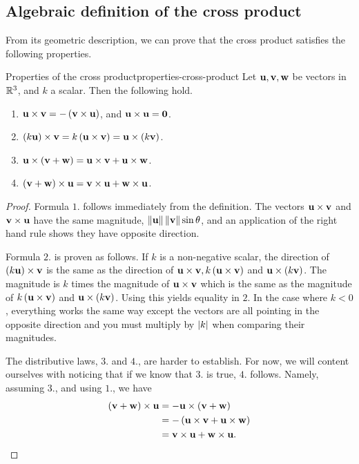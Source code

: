 \subsection{Algebraic definition of the cross product}

From its geometric description, we can prove that the cross product
satisfies the following properties.

\begin{proposition}{Properties of the cross product}{properties-cross-product}
  Let $\mbox{\bf u}, \mbox{\bf v}, \mbox{\bf w}$ be vectors in $\mathbb{R}^3$, and $k$ a
  scalar. Then the following hold.%
  \begin{enumerate}
  \item
    $\mbox{\bf u}\times \mbox{\bf v}= -\left(\mbox{\bf v}\times \mbox{\bf u}\right)$,
    and $\mbox{\bf u}\times \mbox{\bf u}=\mbox{\bf 0}$.
  \item $\left(k \mbox{\bf u}\right)\times \mbox{\bf v}= k \left(\mbox{\bf u}\times \mbox{\bf v}\right) 
    =\mbox{\bf u}\times \left(k \mbox{\bf v}\right)$.
  \item $\mbox{\bf u}\times \left(\mbox{\bf v}+\mbox{\bf w}\right) =\mbox{\bf u}\times \mbox{\bf v}+\mbox{\bf u}\times \mbox{\bf w}$.
  \item $\left(\mbox{\bf v}+\mbox{\bf w}\right) \times \mbox{\bf u}=\mbox{\bf v} \times \mbox{\bf u}+\mbox{\bf w}\times \mbox{\bf u}$.
  \end{enumerate}
\end{proposition}

\begin{proof}
  Formula $1$. follows immediately from the definition. The vectors
  $\mbox{\bf u}\times \mbox{\bf v}$ and $\mbox{\bf v}\times \mbox{\bf u}$ have the
  same magnitude, $\left\|\mbox{\bf u}\right\|\left\|\mbox{\bf v}\right\|\sin \theta $, and an
  application of the right hand rule shows they have opposite
  direction.

  Formula $2$. is proven as follows. If $k $ is a non-negative scalar,
  the direction of $\left(k \mbox{\bf u}\right) \times \mbox{\bf v}$ is the same as
  the direction of
  $\mbox{\bf u}\times \mbox{\bf v}, k \left(\mbox{\bf u}\times \mbox{\bf v}\right) $ and
  $\mbox{\bf u}\times \left( k \mbox{\bf v}\right) $. The magnitude is $k$ times the
  magnitude of $\mbox{\bf u}\times \mbox{\bf v}$ which is the same as the
  magnitude of $k \left(\mbox{\bf u}\times \mbox{\bf v}\right) $ and
  $\mbox{\bf u}\times \left( k \mbox{\bf v}\right) $. Using this yields equality in
  $2$. In the case where $k <0$, everything works the same way except
  the vectors are all pointing in the opposite direction and you must
  multiply by $\left|k \right|$ when comparing their magnitudes.

  The distributive laws, $3$. and $4$., are harder to establish. For
  now, we will content ourselves with noticing that if we know that
  $3$. is true, $4$. follows. Namely, assuming $3$., and using $1$.,
  we have
  \begin{align*}
    \left(\mbox{\bf v}+\mbox{\bf w}\right) \times \mbox{\bf u}
    & =-\mbox{\bf u}\times \left(
      \mbox{\bf v}+\mbox{\bf w}\right) \\
    & =-\left(\mbox{\bf u}\times \mbox{\bf v}+\mbox{\bf u}\times \mbox{\bf w}\right) \\
    & =\mbox{\bf v}\times \mbox{\bf u}+\mbox{\bf w}\times \mbox{\bf u}.
  \end{align*}
\end{proof}


